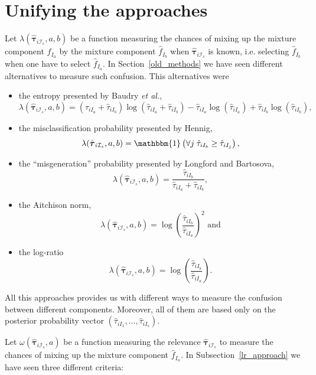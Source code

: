 \documentclass[10pt, a4paper]{article}
\newcommand{\m}[1]{\boldsymbol{#1}}
\begin{document}
\section{Unifying the approaches}
\label{confusion}

Let $\lambda(\hat{\m \tau}_{i \mathcal{I}_s}, a, b)$ be a function measuring the chances of mixing up the mixture component $\hat{f}_{I_a}$ by the mixture component $\hat{f}_{I_b}$ when $\hat{\m \tau}_{i \mathcal{I}_s}$ is known, i.e. selecting $\hat{f}_{I_b}$ when one have to select $\hat{f}_{I_a}$. In Section~\ref{old_methods} we have seen different alternatives to measure such confusion. This alternatives were

\begin{itemize}
\item the entropy presented by Baudry \emph{et al.},
\[\lambda(\hat{\m \tau}_{i \mathcal{I}_s}, a, b) = (\hat{\tau}_{iI_a}+\hat{\tau}_{iI_b}) \log(\hat{\tau}_{iI_a} + \hat{\tau}_{iI_b}) - \hat{\tau}_{iI_a} \log(\hat{\tau}_{iI_a}) + \hat{\tau}_{iI_b} \log(\hat{\tau}_{iI_b}),\]
\item the misclassification probability presented by Hennig, \[\lambda(\hat{\m \tau}_{i \mathcal{I}_s}, a, b) = \mathbbm{1}\left( \forall j\; \hat{\tau}_{i I_{b}} \geq \hat{\tau}_{iI_j} \right),\]
\item the ``misgeneration'' probability presented by Longford and Bartosova, \[\lambda(\hat{\m \tau}_{i \mathcal{I}_s}, a, b) = \frac{\hat{\tau}_{iI_b}}{\hat{\tau}_{iI_a} + \hat{\tau}_{iI_b}},\]
\item the Aitchison norm, \[\lambda(\hat{\m \tau}_{i \mathcal{I}_s}, a, b) = \log (\frac{ \hat{\tau}_{iI_b} }{ \hat{\tau}_{iI_a} })^2 \text{ and}\]
\item the log-ratio \[ \lambda(\hat{\m \tau}_{i \mathcal{I}_s}, a, b) = \log (\frac{ \hat{\tau}_{iI_b} }{ \hat{\tau}_{iI_a} }).\]
\end{itemize}

All this approaches provides us with different ways to measure the confusion between different components. Moreover, all of them are based only on the posterior probability
vector $(\hat{\tau}_{i I_{1}}, \dots, \hat{\tau}_{i I_{s}})$.

Let $\omega(\hat{\m \tau}_{i \mathcal{I}_s}, a)$ be a function measuring the relevance $\hat{\m \tau}_{i \mathcal{I}_s}$ to measure the chances of mixing up  the mixture component $\hat{f}_{I_a}$. In Subsection~\ref{lr_approach} we have seen three different criteria:
\end{document}
